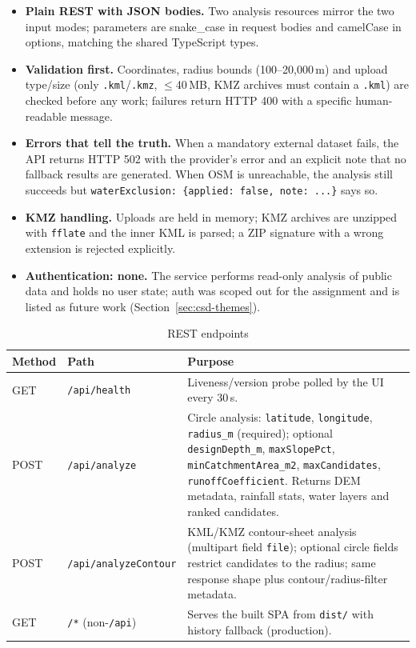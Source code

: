 \documentclass[manuscript,screen,review]{acmart}
\begin{document}
\begin{itemize}
  \item \textbf{Plain REST with JSON bodies.} Two analysis resources mirror
  the two input modes; parameters are snake\_case in request bodies and
  camelCase in options, matching the shared TypeScript types.
  \item \textbf{Validation first.} Coordinates, radius bounds
  (100--20{,}000\,m) and upload type/size (only \texttt{.kml}/\texttt{.kmz},
  $\leq$40\,MB, KMZ archives must contain a \texttt{.kml}) are checked before
  any work; failures return HTTP 400 with a specific human-readable message.
  \item \textbf{Errors that tell the truth.} When a mandatory external
  dataset fails, the API returns HTTP 502 with the provider's error and an
  explicit note that no fallback results are generated. When OSM is
  unreachable, the analysis still succeeds but
  \texttt{waterExclusion:\ \{applied:\ false,\ note:\ ...\}} says so.
  \item \textbf{KMZ handling.} Uploads are held in memory; KMZ archives are
  unzipped with \texttt{fflate} and the inner KML is parsed; a ZIP signature
  with a wrong extension is rejected explicitly.
  \item \textbf{Authentication: none.} The service performs read-only
  analysis of public data and holds no user state; auth was scoped out for
  the assignment and is listed as future work (Section~\ref{sec:csd-themes}).
\end{itemize}

\begin{table}[h]
  \caption{REST endpoints}
  \label{tab:endpoints}
  \begin{tabular}{p{1.4cm}p{4.0cm}p{6.6cm}}
    \toprule
    Method & Path & Purpose \\
    \midrule
    GET & \small\texttt{/api/health} & Liveness/version probe polled by the UI every 30\,s. \\
    POST & \small\texttt{/api/analyze} & Circle analysis: \texttt{latitude}, \texttt{longitude}, \texttt{radius\_m} (required); optional \texttt{designDepth\_m}, \texttt{maxSlopePct}, \texttt{minCatchmentArea\_m2}, \texttt{maxCandidates}, \texttt{runoffCoefficient}. Returns DEM metadata, rainfall stats, water layers and ranked candidates. \\
    POST & \small\texttt{/api/analyzeContour} & KML/KMZ contour-sheet analysis (multipart field \texttt{file}); optional circle fields restrict candidates to the radius; same response shape plus contour/radius-filter metadata. \\
    GET & \small\texttt{/*} (non-\texttt{/api}) & Serves the built SPA from \texttt{dist/} with history fallback (production). \\
    \bottomrule
  \end{tabular}
\end{table}
\end{document}
